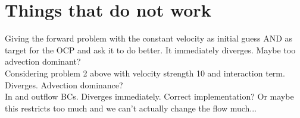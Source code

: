 \documentclass[11pt, a4paper]{article}
\theoremstyle{definition}
\begin{document}
    \section{Things that do not work}
    Giving the forward problem with the constant velocity as initial guess AND as target for the OCP and ask it to do better. It immediately diverges. Maybe too advection dominant?\\
    Considering problem 2 above with velocity strength 10 and interaction term. Diverges. Advection dominance?\\
    In and outflow BCs. Diverges immediately. Correct implementation? Or maybe this restricts too much and we can't actually change the flow much...  
    
    
    
    
\end{document}
